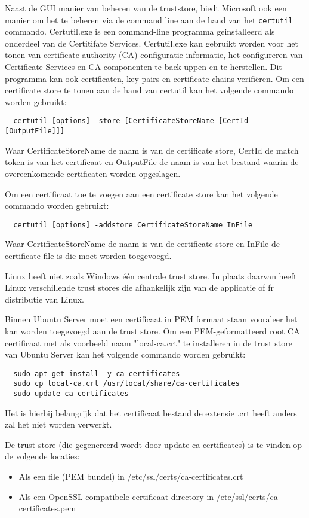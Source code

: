 Naast de GUI manier van beheren van de truststore, biedt Microsoft ook een manier om het te beheren via de command line aan de hand van het \texttt{certutil} commando.
Certutil.exe is een command-line programma geinstalleerd als onderdeel van de Certitifate Services. Certutil.exe kan gebruikt worden voor het tonen van certificate authority (CA) configuratie informatie, het configureren van Certificate Services en CA componenten te back-uppen en te herstellen.
Dit programma kan ook certificaten, key pairs en certificate chains verifiëren. \autocite{MScertutil}
Om een certificate store te tonen aan de hand van certutil kan het volgende commando worden gebruikt:
\begin{verbatim}
  certutil [options] -store [CertificateStoreName [CertId [OutputFile]]]
\end{verbatim}
Waar CertificateStoreName de naam is van de certificate store, CertId de match token is van het certificaat en OutputFile de naam is van het bestand waarin de overeenkomende certificaten worden opgeslagen. \autocite{MScertutil}

Om een certificaat toe te voegen aan een certificate store kan het volgende commando worden gebruikt:
\begin{verbatim}
  certutil [options] -addstore CertificateStoreName InFile
\end{verbatim}
Waar CertificateStoreName de naam is van de certificate store en InFile de certificate file is die moet worden toegevoegd. \autocite{MScertutil} \break

Linux heeft niet zoals Windows één centrale trust store. In plaats daarvan heeft Linux verschillende trust stores die afhankelijk zijn van de applicatie of fr distributie van Linux.

Binnen Ubuntu Server moet een certificaat in PEM formaat staan vooraleer het kan worden toegevoegd aan de trust store.
Om een PEM-geformatteerd root CA certificaat met als voorbeeld naam "local-ca.crt" te installeren in de trust store van Ubuntu Server kan het volgende commando worden gebruikt:
\begin{verbatim}
  sudo apt-get install -y ca-certificates
  sudo cp local-ca.crt /usr/local/share/ca-certificates
  sudo update-ca-certificates
\end{verbatim}

Het is hierbij belangrijk dat het certificaat bestand de extensie .crt heeft anders zal het niet worden verwerkt.

De trust store (die gegenereerd wordt door update-ca-certificates) is te vinden op de volgende locaties:
\begin{itemize}
  \item Als een file (PEM bundel) in /etc/ssl/certs/ca-certificates.crt
  \item Als een OpenSSL-compatibele certificaat directory in /etc/ssl/certs/ca-certificates.pem
\end{itemize} \autocite{UbunTruststore}
\break

